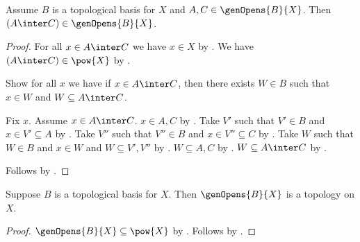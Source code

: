 \begin{lemma}\label{inters_in_genopens}
    Assume $B$ is a topological basis for $X$ and
        $A, C\in \genOpens{B}{X}$.
    Then $(A\inter C) \in \genOpens{B}{X}$.
\end{lemma}
\begin{proof}
    For all $x\in A\inter C$ we have $x\in X$
        by .
    We have $(A\inter C)\in\pow{X}$ by .

    Show for all $x$ we have if $x\in A\inter C$, then
    there exists $W\in B$ such that $x\in W$ and $W\subseteq A\inter C$.
    \begin{subproof}
        Fix $x$.
        Assume $x\in A\inter C$.
        $x\in A,C$ by .
        Take $V'$ such that $V'\in B$ and $x\in V'\subseteq A$
            by .
        Take $V''$ such that $V''\in B$ and $x\in V''\subseteq C$
            by .
        Take $W$ such that $W\in B$ and $x\in W$ and
            $W\subseteq V',V''$ by .
        $W\subseteq A,C$ by .
        $W\subseteq A\inter C$ by .
    \end{subproof}
    Follows by .
\end{proof}

\begin{theorem}\label{genopens_form_topology}
    Suppose $B$ is a topological basis for $X$.
    Then $\genOpens{B}{X}$ is a topology on $X$.
\end{theorem}
\begin{proof}
    $\genOpens{B}{X}\subseteq\pow{X}$
        by .
    Follows by
        .
\end{proof}

